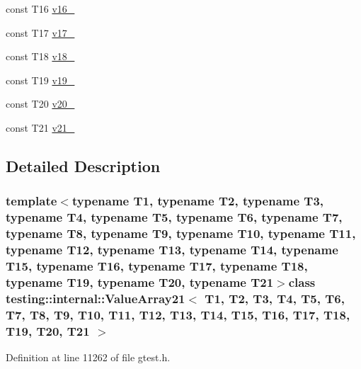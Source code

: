 \begin{DoxyCompactItemize}
\item 
const \-T16 \hyperlink{classtesting_1_1internal_1_1ValueArray21_a8b2b80d31925c1583c3e694d2bf235c5}{v16\-\_\-}
\item 
const \-T17 \hyperlink{classtesting_1_1internal_1_1ValueArray21_a9f59ea9e6f3642f77227dd1f7882d649}{v17\-\_\-}
\item 
const \-T18 \hyperlink{classtesting_1_1internal_1_1ValueArray21_ad07972ee98135c8deb090fc891a04e3e}{v18\-\_\-}
\item 
const \-T19 \hyperlink{classtesting_1_1internal_1_1ValueArray21_a3ad77b5b43c14332dabc9d47c8907e7f}{v19\-\_\-}
\item 
const \-T20 \hyperlink{classtesting_1_1internal_1_1ValueArray21_adb43992f7b5f5f07e0187003b8c9c872}{v20\-\_\-}
\item 
const \-T21 \hyperlink{classtesting_1_1internal_1_1ValueArray21_a80089b2eaa99efb5d3559378fbdac426}{v21\-\_\-}
\end{DoxyCompactItemize}


\subsection{\-Detailed \-Description}
\subsubsection*{template$<$typename T1, typename T2, typename T3, typename T4, typename T5, typename T6, typename T7, typename T8, typename T9, typename T10, typename T11, typename T12, typename T13, typename T14, typename T15, typename T16, typename T17, typename T18, typename T19, typename T20, typename T21$>$class testing\-::internal\-::\-Value\-Array21$<$ T1, T2, T3, T4, T5, T6, T7, T8, T9, T10, T11, T12, T13, T14, T15, T16, T17, T18, T19, T20, T21 $>$}



\-Definition at line 11262 of file gtest.\-h.



